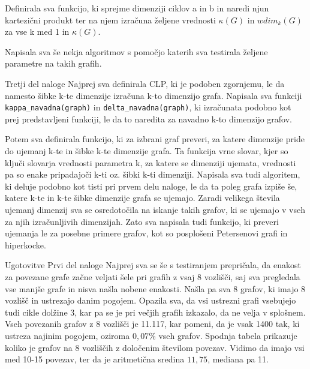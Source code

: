 \documentclass[12pt,a4paper]{amsart}
\makeatletter
\renewcommand\section{\@startsection{section}{1}%
  \z@{.5\linespacing\@plus.7\linespacing}{.5\linespacing}%
  {\normalfont\scshape\large\centering}}
\renewcommand\subsection{\@startsection{subsection}{2}%
  \z@{.5\linespacing\@plus.7\linespacing}{.5\linespacing}%
  {\normalfont\scshape}}
\theoremstyle{plain} %
\makeatother
\begin{document}
Definirala sva funkcijo, ki sprejme dimenziji ciklov a in b in naredi njun kartezični produkt ter na njem izračuna željene vrednosti 
$\kappa(G)$ in $wdim_k(G)$ za vse k med 1 in $\kappa(G)$.

Napisala sva še nekja algoritmov s pomočjo katerih sva testirala željene parametre na takih grafih.
\bigskip

\subsection{Tretji del naloge}
Najprej sva definirala CLP, ki je podoben zgornjemu, le da namesto šibke k-te dimenzije izračuna k-to dimenzijo grafa.
Napisala sva funkciji 
\verb|kappa_navadna(graph)| in \verb|delta_navadna(graph)|, ki izračunata podobno kot prej predstavljeni funkciji, le da to naredita za navadno k-to dimenzijo grafov. 

Potem sva definirala funkcijo, ki za izbrani graf preveri, za katere dimenzije pride do ujemanj k-te in šibke k-te dimenzije grafa.
Ta funkcija vrne slovar, kjer so ključi slovarja vrednosti parametra k, za katere se dimenziji ujemata, vrednosti pa so enake pripadajoči k-ti oz. šibki k-ti dimenziji.
Napisala sva tudi algoritem, ki deluje podobno kot tisti pri prvem delu naloge, le da ta poleg grafa
izpiše še, katere k-te in k-te šibke dimenzije grafa se ujemajo.
Zaradi velikega števila ujemanj dimenzij sva se osredotočila na iskanje takih grafov, ki se ujemajo v vseh za njih izračunljivih dimenzijah.
Zato sva napisala tudi funkcijo, ki preveri ujemanja le za posebne primere grafov, kot so posplošeni Petersenovi grafi in hiperkocke.


\section{Ugotovitve}
\subsection{Prvi del naloge}
Najprej sva se še s testiranjem prepričala, da enakost za povezane grafe začne veljati šele pri grafih z vsaj 8 vozlišči, saj sva pregledala vse manjše grafe in nisva našla nobene enakosti.
Našla pa sva 8 grafov, ki imajo 8 vozlišč in ustrezajo danim pogojem. Opazila sva, da vsi ustrezni grafi vsebujejo
tudi cikle dolžine 3, kar pa se je pri večjih grafih izkazalo, da ne velja v splošnem. Vseh povezanih grafov z 8 vozlišči je 11.117, kar pomeni, da je vsak 1400 tak, 
ki ustreza najinim pogojem, oziroma $0,07 \%$ vseh grafov. Spodnja tabela prikazuje koliko je grafov na 8 vozliščih z določenim številom povezav. 
Vidimo da imajo vsi med 10-15 povezav, ter da je aritmetična sredina $11,75$, mediana pa 11.
\end{document}
